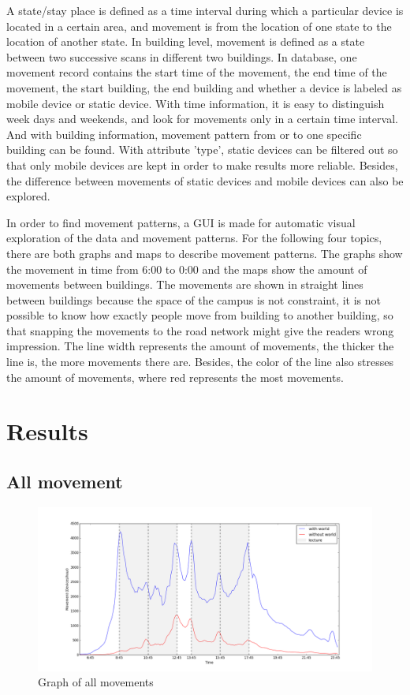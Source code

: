 A state/stay place is defined as a time interval during which a particular device is located in a certain area, and movement is from the location of one state to the location of another state. In building level, movement is defined as a state between two successive scans in different two buildings.
In database, one movement record contains the start time of the movement, the end time of the movement, the start building, the end building and whether a device is labeled as mobile device or static device. With time information, it is easy to distinguish week days and weekends, and look for movements only in a certain time interval. And with building information, movement pattern from or to one specific building can be found. With attribute 'type', static devices can be filtered out so that only mobile devices are kept in order to make results more reliable. Besides, the difference between movements of static devices and mobile devices can also be explored.

In order to find movement patterns, a GUI is made for automatic visual exploration of the data and movement patterns. For the following four topics, there are both graphs and maps to describe movement patterns. The graphs show the movement in time from 6:00 to 0:00 and the maps show the amount of movements between buildings. The movements are shown in straight lines between buildings because the space of the campus is not constraint, it is not possible to know how exactly people move from building to another building, so that snapping the movements to the road network might give the readers wrong impression. The line width represents the amount of movements, the thicker the line is, the more movements there are. Besides, the color of the line also stresses the amount of movements, where red represents the most movements.

\section{Results}\label{chapter9results}
\subsection{All movement}\label{chapter9Allmovement}

\begin{figure}[H]
	\centering
	\includegraphics[scale=0.3]{building_all_graph.png}
	\captionsetup{justification=centering}
	\caption{Graph of all movements}
	\label{building_all_graph}
\end{figure}

